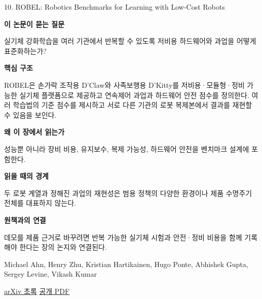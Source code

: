 \documentclass[11pt,openany]{book}
\begin{document}
\begin{termcard}{10. ROBEL: Robotics Benchmarks for Learning with Low-Cost Robots}

\par

\medskip

{\sffamily\bfseries\color{deepblue} 이 논문이 묻는 질문}\par

실기체 강화학습을 여러 기관에서 반복할 수 있도록 저비용 하드웨어와 과업을 어떻게 표준화하는가?

\smallskip

{\sffamily\bfseries\color{deepblue} 핵심 구조}\par

ROBEL은 손가락 조작용 D'Claw와 사족보행용 D'Kitty를 저비용·모듈형·정비 가능한 실기체 플랫폼으로 제공하고 연속제어 과업과 하드웨어 안전 점수를 정의한다. 여러 학습법의 기준 점수를 제시하고 서로 다른 기관의 로봇 복제본에서 결과를 재현할 수 있음을 보인다.

\smallskip

{\sffamily\bfseries\color{deepblue} 왜 이 장에서 읽는가}\par

성능뿐 아니라 장비 비용, 유지보수, 복제 가능성, 하드웨어 안전을 벤치마크 설계에 포함한다.

\smallskip

{\sffamily\bfseries\color{coral} 읽을 때의 경계}\par

두 로봇 계열과 정해진 과업의 재현성은 범용 정책의 다양한 환경이나 제품 수명주기 전체를 대표하지 않는다.

\smallskip

{\sffamily\bfseries\color{teal} 원책과의 연결}\par

데모를 제품 근거로 바꾸려면 반복 가능한 실기체 시험과 안전·정비 비용을 함께 기록해야 한다는 장의 논지와 연결된다.

\medskip

{\footnotesize\color{muted} Michael Ahn, Henry Zhu, Kristian Hartikainen, Hugo Ponte, Abhishek Gupta, Sergey Levine, Vikash Kumar\par

\href{https://arxiv.org/abs/1909.11639}{arXiv 초록} \quad \href{https://arxiv.org/pdf/1909.11639}{공개 PDF}\par}

\end{termcard}
\end{document}

